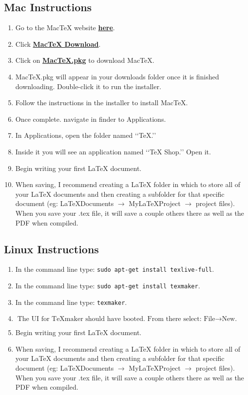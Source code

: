 \documentclass{article}
\begin{document}
		\subsection{Mac Instructions}
			\begin{enumerate}
				\item Go to the MacTeX website \href{http://www.tug.org/mactex/}{\textbf{here}}.
				\item Click \href{http://www.tug.org/mactex/mactex-download.html}{\textbf{MacTeX Download}}.
				\item Click on \href{http://tug.org/cgi-bin/mactex-download/MacTeX.pkg}{\textbf{MacTeX.pkg}} to download MacTeX.
				\item MacTeX.pkg will appear in your downloads folder once it is finished downloading. Double-click it to run the installer.
				\item Follow the instructions in the installer to install MacTeX.
				\item Once complete. navigate  in finder to Applications.
				\item In Applications, open the folder named \lq\lq{}TeX.\rq\rq{}
				\item Inside it you will see an application named \lq\lq{}TeX Shop.\rq\rq{} Open it.
				\item Begin writing your first \LaTeX{} document.
				\item When saving, I recommend creating a LaTeX folder in which to store all of your  \LaTeX{} documents and then creating a subfolder for that specific document (eg: LaTeXDocuments \(\rightarrow\) MyLaTeXProject \(\rightarrow\) project files). When you save your .tex file, it will save a couple others there as well as the PDF when compiled.
			\end{enumerate}

		\subsection{Linux Instructions}
			\begin{enumerate}
				\item In the command line type: \texttt{sudo apt-get install texlive-full}.
				\item In the command line type: \texttt{sudo apt-get install texmaker}.
				\item In the command line type: \texttt{texmaker}.
				\item \(\text{The UI for TeXmaker should have booted. From there select: File} \rightarrow \text{New.}\)
				\item Begin writing your first \LaTeX{} document.
				\item When saving, I recommend creating a LaTeX folder in which to store all of your \LaTeX{} documents and then creating a subfolder for that specific document (eg: LaTeXDocuments \(\rightarrow\) MyLaTeXProject \(\rightarrow\) project files). When you save your .tex file, it will save a couple others there as well as the PDF when compiled.
			\end{enumerate}
\end{document}
